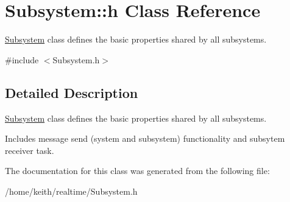 \hypertarget{classSubsystem_1_1h}{\section{Subsystem\-:\-:h Class Reference}
\label{classSubsystem_1_1h}
}


\hyperlink{classSubsystem}{Subsystem} class defines the basic properties shared by all subsystems.  




{\ttfamily \#include $<$Subsystem.\-h$>$}



\subsection{Detailed Description}
\hyperlink{classSubsystem}{Subsystem} class defines the basic properties shared by all subsystems. 

Includes message send (system and subsystem) functionality and subsytem receiver task. 

The documentation for this class was generated from the following file\-:\begin{DoxyCompactItemize}
\item 
/home/keith/realtime/Subsystem.\-h\end{DoxyCompactItemize}
